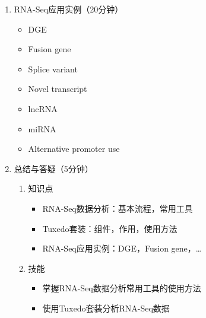 \documentclass{TIJMUjiaoanLL}
\begin{document}
\begin{enumerate}
  \item RNA-Seq应用实例（20分钟）
  \begin{multicols}{3}
    \begin{itemize}
      \item DGE
      \item Fusion gene
      \item Splice variant
      \item Novel transcript
      \item lncRNA
      \item miRNA
      \item Alternative promoter use
    \end{itemize}
  \end{multicols}

\otherTail
\newpage
\otherHeader

  \item 总结与答疑（5分钟）
    \begin{enumerate}
      \item 知识点
	\begin{itemize}
    \item RNA-Seq数据分析：基本流程，常用工具
	  \item Tuxedo套装：组件，作用，使用方法
    \item RNA-Seq应用实例：DGE，Fusion gene，…
	\end{itemize}
      \item 技能
	\begin{itemize}
    \item 掌握RNA-Seq数据分析常用工具的使用方法
    \item 使用Tuxedo套装分析RNA-Seq数据
	\end{itemize}
    \end{enumerate}
\end{enumerate}

\otherTail
\end{document}
